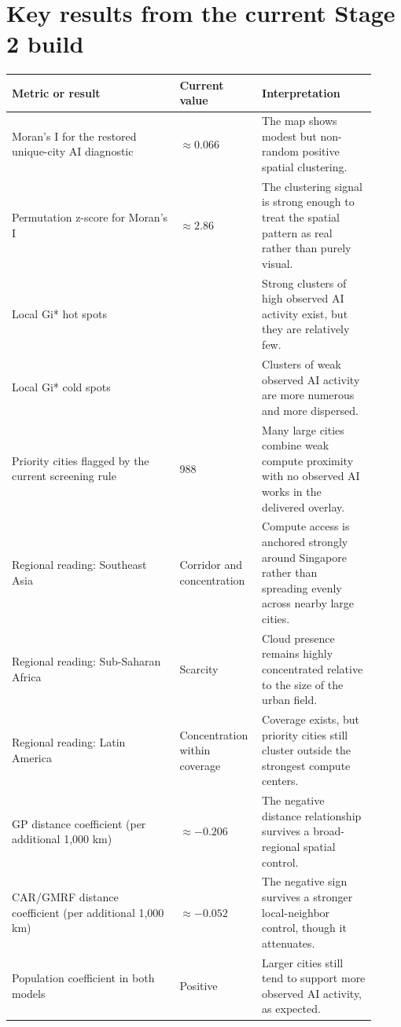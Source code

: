 \documentclass[11pt]{article}
\begin{document}
\section{Key results from the current Stage 2 build}
\begin{longtable}{>{\raggedright\arraybackslash}p{0.44\linewidth} >{\raggedright\arraybackslash}p{0.18\linewidth} >{\raggedright\arraybackslash}p{0.30\linewidth}}
\toprule
\textbf{Metric or result} & \textbf{Current value} & \textbf{Interpretation} \\
\midrule
Moran's I for the restored unique-city AI diagnostic & $\approx 0.066$ & The map shows modest but non-random positive spatial clustering. \\
Permutation z-score for Moran's I & $\approx 2.86$ & The clustering signal is strong enough to treat the spatial pattern as real rather than purely visual. \\
Local Gi* hot spots & 7 & Strong clusters of high observed AI activity exist, but they are relatively few. \\
Local Gi* cold spots & 33 & Clusters of weak observed AI activity are more numerous and more dispersed. \\
Priority cities flagged by the current screening rule & 1{,}988 & Many large cities combine weak compute proximity with no observed AI works in the delivered overlay. \\
Regional reading: Southeast Asia & Corridor and concentration & Compute access is anchored strongly around Singapore rather than spreading evenly across nearby large cities. \\
Regional reading: Sub-Saharan Africa & Scarcity & Cloud presence remains highly concentrated relative to the size of the urban field. \\
Regional reading: Latin America & Concentration within coverage & Coverage exists, but priority cities still cluster outside the strongest compute centers. \\
GP distance coefficient (per additional 1{,}000 km) & $\approx -0.206$ & The negative distance relationship survives a broad-regional spatial control. \\
CAR/GMRF distance coefficient (per additional 1{,}000 km) & $\approx -0.052$ & The negative sign survives a stronger local-neighbor control, though it attenuates. \\
Population coefficient in both models & Positive & Larger cities still tend to support more observed AI activity, as expected. \\
\bottomrule
\end{longtable}
\end{document}

